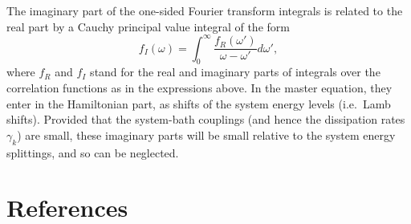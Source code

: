 \documentclass[12pt]{iopart}
\begin{document}
The imaginary part of the one-sided Fourier transform integrals is related to the real part by a Cauchy principal value integral of the form
\begin{equation}
f_I(\omega) =  \int_0^\infty \frac{f_R(\omega')}{\omega - \omega'} d\omega' ,
\end{equation}
where $f_R$ and $f_I$ stand for the real and imaginary parts of integrals over the correlation functions as in the expressions above. In the master equation, they enter in the Hamiltonian part, as shifts of the system energy levels (i.e.~Lamb shifts). Provided that the system-bath couplings (and hence the dissipation rates $\gamma_k$) are small, these imaginary parts will be small relative to the system energy splittings, and so can be neglected.



\section*{References}
\providecommand{\newblock}{}
\end{document}
